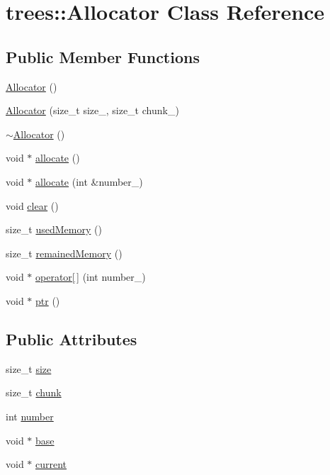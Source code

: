 \hypertarget{classtrees_1_1_allocator}{}\section{trees\+:\+:Allocator Class Reference}
\label{classtrees_1_1_allocator}
\subsection*{Public Member Functions}
\begin{DoxyCompactItemize}
\item 
\hyperlink{classtrees_1_1_allocator_a61b4f2e39ef2984f0cb57a0005e5a1b8}{Allocator} ()
\item 
\hyperlink{classtrees_1_1_allocator_a539219cedd5fc9fae0d24be3212fbcea}{Allocator} (size\+\_\+t size\+\_\+, size\+\_\+t chunk\+\_\+)
\item 
\hyperlink{classtrees_1_1_allocator_a2a04e2aae952342f63846f91be214cb3}{$\sim$\+Allocator} ()
\item 
void $\ast$ \hyperlink{classtrees_1_1_allocator_aa35a3d63a9a05ce16f01fcd290973990}{allocate} ()
\item 
void $\ast$ \hyperlink{classtrees_1_1_allocator_a03c0be0196af451bfd8c48dbe6fdb1f1}{allocate} (int \&number\+\_\+)
\item 
void \hyperlink{classtrees_1_1_allocator_ab604fe92fe429a8149dfbc3ab3d6fe5b}{clear} ()
\item 
size\+\_\+t \hyperlink{classtrees_1_1_allocator_af3266a905a5482ac22c24f5c2b2349fd}{used\+Memory} ()
\item 
size\+\_\+t \hyperlink{classtrees_1_1_allocator_ad9a9e6fb8eeca7d3f8cb89e24a2da54f}{remained\+Memory} ()
\item 
void $\ast$ \hyperlink{classtrees_1_1_allocator_adf38461ff66c1ea2a7aff5e178f30389}{operator\mbox{[}$\,$\mbox{]}} (int number\+\_\+)
\item 
void $\ast$ \hyperlink{classtrees_1_1_allocator_a04d8eebe7efde053e4c856767cf25656}{ptr} ()
\end{DoxyCompactItemize}
\subsection*{Public Attributes}
\begin{DoxyCompactItemize}
\item 
size\+\_\+t \hyperlink{classtrees_1_1_allocator_a4e5438309246d70ff0c6d9a9f02883cc}{size}
\item 
size\+\_\+t \hyperlink{classtrees_1_1_allocator_a2b01b14ef276d4f876bbbb842e112b36}{chunk}
\item 
int \hyperlink{classtrees_1_1_allocator_a05591d52d447953dc864ca6052fb8954}{number}
\item 
void $\ast$ \hyperlink{classtrees_1_1_allocator_a9cd94b47f93ea913811291ce8a3071a1}{base}
\item 
void $\ast$ \hyperlink{classtrees_1_1_allocator_a2dd281e0ddcba5999da2e4233c405684}{current}
\end{DoxyCompactItemize}


